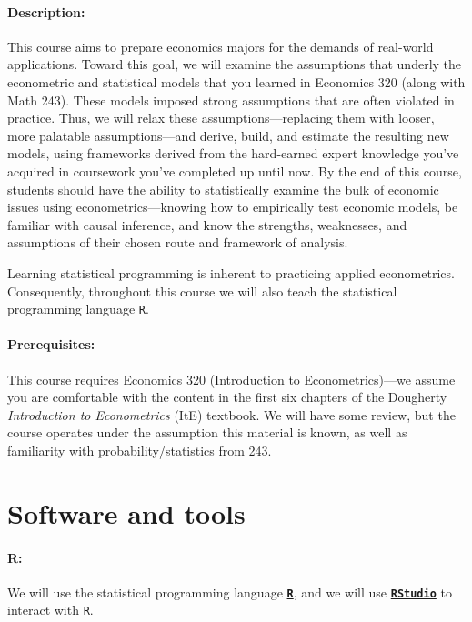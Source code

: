 \documentclass[10pt]{article}
\begin{document}
\paragraph{Description:} This course aims to prepare economics majors for the demands of real-world applications. Toward this goal, we will examine the assumptions that underly the econometric and statistical models that you learned in Economics 320 (along with Math 243). These models imposed strong assumptions that are often violated in practice. Thus, we will relax these assumptions---replacing them with looser, more palatable assumptions---and derive, build, and estimate the resulting new models, using frameworks derived from the hard-earned expert knowledge you've acquired in coursework you've completed up until now. By the end of this course, students should have the ability to statistically examine the bulk of economic issues using econometrics---knowing how to empirically test economic models, be familiar with causal inference, and know the strengths, weaknesses, and assumptions of their chosen route and framework of analysis.

Learning statistical programming is inherent to practicing applied econometrics. Consequently, throughout this course we will also teach the statistical programming language \texttt{{R}}.

\paragraph{Prerequisites:} This course requires Economics 320 (Introduction to Econometrics)---we assume you are comfortable with the content in the first six chapters of the Dougherty \textit{Introduction to Econometrics} (ItE) textbook. We will have some review, but the course operates under the assumption this material is known, as well as familiarity with probability/statistics from 243.

\section*{Software and tools}

\paragraph{R:} We will use the statistical programming language \href{https://www.r-project.org/}{\textbf{\texttt{R}}}, and we will use \href{https://www.rstudio.com}{\textbf{\texttt{RStudio}}} to interact with \texttt{R}.
\end{document}
